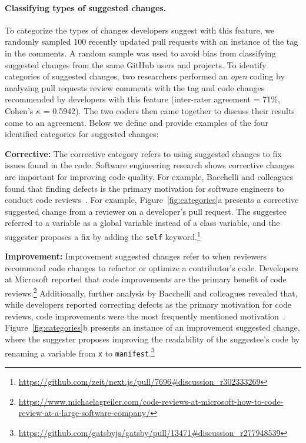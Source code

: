 \paragraph{Classifying types of suggested changes.}
To categorize the types of changes developers suggest with this feature, we randomly sampled 100 recently updated pull requests with an instance of the \sugg tag in the comments. A random sample was used to avoid bias from classifying suggested changes from the same GitHub users and projects. To identify categories of suggested changes, two researchers performed an \textit{open} coding by analyzing pull requests review comments with the \sugg tag and code changes recommended by developers with this feature (inter-rater agreement = 71\%, Cohen's $\kappa$ = 0.5942). The two coders then came together to discuss their results come to an agreement. Below we define and provide examples of the four identified categories for suggested changes:

\textbf{Corrective:} The corrective category refers to using suggested changes to fix issues found in the code. Software engineering research shows corrective changes are important for improving code quality. For example, Bacchelli and colleagues found that finding defects is the primary motivation for software engineers to conduct code reviews~\cite{bacchelli2013codereview}. For example, Figure~\ref{fig:categories}a presents a corrective suggested change from a reviewer on a developer's pull request. The suggestee referred to a variable as a global variable instead of a class variable, and the suggester proposes a fix by adding the \texttt{self} keyword.\footnote{\url{https://github.com/zeit/next.js/pull/7696\#discussion_r302333269}}

\textbf{Improvement:} Improvement suggested changes refer to when reviewers recommend code changes to refactor or optimize a contributor's code. Developers at Microsoft reported that code improvements are the primary benefit of code reviews.\footnote{\url{https://www.michaelagreiler.com/code-reviews-at-microsoft-how-to-code-review-at-a-large-software-company/}} Additionally, further analysis by Bacchelli and colleagues revealed that, while developers reported correcting defects as the primary motivation for code reviews, code improvements were the most frequently mentioned motivation~\cite{bacchelli2013codereview}. Figure~\ref{fig:categories}b presents an instance of an improvement suggested change, where the suggester proposes improving the readability of the suggestee's code by renaming a variable from \texttt{x} to \texttt{manifest}.\footnote{\url{https://github.com/gatsbyjs/gatsby/pull/13471\#discussion_r277948539}}

